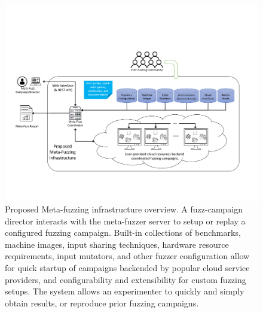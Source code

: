 \begin{figure}[htbp!]


\includegraphics[width=\textwidth,trim={0.4in 1.25in 0.8in 2.0in},clip]{figures/mf-arch.pdf}

\caption{\small Proposed Meta-fuzzing infrastructure overview.  
A fuzz-campaign director interacts with the meta-fuzzer server to setup or replay a configured fuzzing campaign.  
Built-in collections of benchmarks, machine images, input sharing techniques, hardware resource requirements, input mutators, and other fuzzer configuration 
allow for quick startup of campaigns backended by popular cloud service providers, and configurability and extensibility for custom fuzzing setups.  
The system allows an experimenter to quickly and simply obtain results, or reproduce prior fuzzing campaigns.}
\label{fig:overview}
\end{figure}



